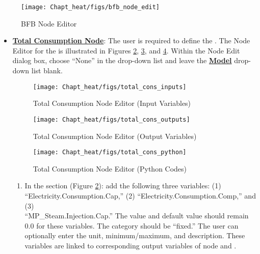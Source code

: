 \begin{figure}[H]
	\begin{center}
		\texttt{[image: Chapt\_heat/figs/bfb\_node\_edit]}
		\caption{BFB Node Editor}
		\label{bfb.node.edit}
	\end{center}
\end{figure}


\begin{itemize}
	\item \textbf{\underline{Total Consumption Node}}: The user is required to define the . The Node Editor for the  is illustrated in Figures \ref{total.cons.inputs}, \ref{total.cons.outputs}, and \ref{total.cons.python}. Within the Node Edit dialog box, choose ``None'' in the  drop-down list and leave the \textbf{\underline{Model}} drop-down list blank.
		\begin{figure}[H]
			\begin{center}
				\texttt{[image: Chapt\_heat/figs/total\_cons\_inputs]}
				\caption{Total Consumption Node Editor (Input Variables)}
				\label{total.cons.inputs}
			\end{center}
		\end{figure}
		\begin{figure}[H]
			\begin{center}
				\texttt{[image: Chapt\_heat/figs/total\_cons\_outputs]}
				\caption{Total Consumption Node Editor (Output Variables)}
				\label{total.cons.outputs}
			\end{center}
		\end{figure}
		\begin{figure}[H]
			\begin{center}
				\texttt{[image: Chapt\_heat/figs/total\_cons\_python]}
				\caption{Total Consumption Node Editor (Python Codes)}
				\label{total.cons.python}
			\end{center}
		\end{figure}
	\begin{enumerate}
		\item In the  section (Figure \ref{total.cons.inputs}): add the following three variables: 
		(1) ``Electricity.Consumption.Cap,'' (2) ``Electricity.Consumption.Comp,'' and (3)\\ ``MP\_Steam.Injection.Cap.'' The value and default value should remain 0.0 for these variables. The category should be ``fixed.'' The user can optionally enter the unit, minimum/maximum, and description. These variables are linked to corresponding output variables of node  and .


\end{enumerate}
\end{itemize}
